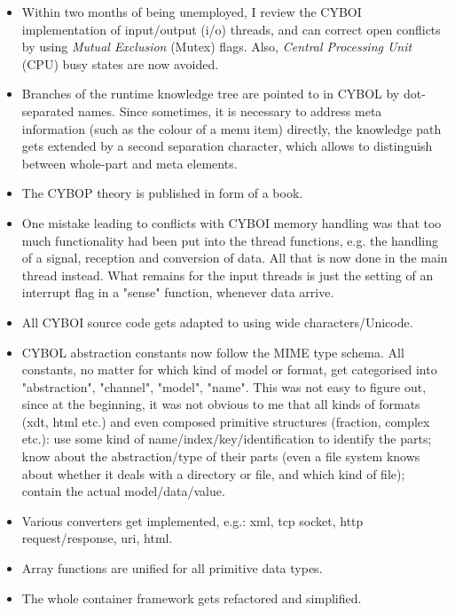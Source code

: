 \begin{itemize}
    \item[2006] Within two months of being unemployed, I review the CYBOI
        implementation of input/output (i/o) threads, and can correct open
        conflicts by using \emph{Mutual Exclusion} (Mutex) flags.
        Also, \emph{Central Processing Unit} (CPU) busy states are now avoided.
    \item[2006] Branches of the runtime knowledge tree are pointed to in CYBOL
        by dot-separated names. Since sometimes, it is necessary to address meta
        information (such as the colour of a menu item) directly, the knowledge
        path gets extended by a second separation character, which allows to
        distinguish between whole-part and meta elements.
    \item[2007] The CYBOP theory is published in form of a book.
    \item[2008] One mistake leading to conflicts with CYBOI memory handling was
        that too much functionality had been put into the thread functions,
        e.g. the handling of a signal, reception and conversion of data.
        All that is now done in the main thread instead. What remains for the
        input threads is just the setting of an interrupt flag in a
        "sense" function, whenever data arrive.
    \item[2008] All CYBOI source code gets adapted to using wide characters/Unicode.
    \item[2008] CYBOL abstraction constants now follow the MIME type schema.
        All constants, no matter for which kind of model or format,
        get categorised into "abstraction", "channel", "model", "name".
        This was not easy to figure out, since at the beginning,
        it was not obvious to me that all kinds of formats (xdt, html etc.)
        and even composed primitive structures (fraction, complex etc.):
        use some kind of name/index/key/identification to identify the parts;
        know about the abstraction/type of their parts (even a file system knows
        about whether it deals with a directory or file, and which kind of file);
        contain the actual model/data/value.
    \item[2009] Various converters get implemented, e.g.:
        xml, tcp socket, http request/response, uri, html.
    \item[2010] Array functions are unified for all primitive data types.
    \item[2011] The whole container framework gets refactored and simplified.

\end{itemize}
